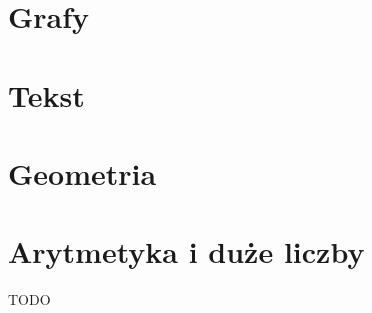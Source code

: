 \documentclass{article}
\begin{document}
\section{Grafy}

\newpage
\section{Tekst}

\newpage
\section{Geometria}

\newpage
\section{Arytmetyka i duże liczby}
TODO
\end{document}
